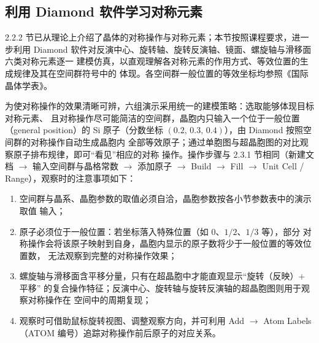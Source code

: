 \subsection{利用 Diamond 软件学习对称元素}

2.2.2 节已从理论上介绍了晶体的对称操作与对称元素；本节按照课程要求，进一步利用
Diamond 软件对反演中心、旋转轴、旋转反演轴、镜面、螺旋轴与滑移面六类对称元素逐一
建模仿真，以直观理解各对称元素的作用方式、等效位置的生成规律及其在空间群符号中的
体现。各空间群一般位置的等效坐标均参照《国际晶体学表》\cite{hahn2005itt}。

为使对称操作的效果清晰可辨，六组演示采用统一的建模策略：选取能够体现目标对称元素、
且对称操作尽可能简洁的空间群，晶胞内只输入一个位于一般位置（general position）的
Si 原子（分数坐标 $(0.2,\,0.3,\,0.4)$），由 Diamond 按照空间群的对称操作自动生成晶胞内
全部等效原子；通过单胞图与超晶胞图的对比观察原子排布规律，即可``看见''相应的对称
操作。操作步骤与 2.3.1 节相同（新建文档 $\to$ 输入空间群与晶格常数 $\to$ 添加原子
$\to$ Build $\to$ Fill $\to$ Unit Cell / Range），观察时的注意事项如下：

\begin{enumerate}[label=（\arabic*）]
  \item 空间群与晶系、晶胞参数的取值必须自洽，晶胞参数按各小节参数表中的演示取值
    输入；
  \item 原子必须位于一般位置：若坐标落入特殊位置（如 $0$、$1/2$、$1/3$ 等），部分
    对称操作会将该原子映射到自身，晶胞内显示的原子数将少于一般位置的等效位置数，
    无法观察到完整的对称操作效果；
  \item 螺旋轴与滑移面含平移分量，只有在超晶胞中才能直观显示``旋转（反映）$+$ 平移''
    的复合操作特征；反演中心、旋转轴与旋转反演轴的超晶胞图则用于观察对称操作在
    空间中的周期复现；
  \item 观察时可借助鼠标旋转视图、调整观察方向，并可利用 Add $\to$ Atom Labels
    （ATOM 编号）追踪对称操作前后原子的对应关系。
\end{enumerate}
